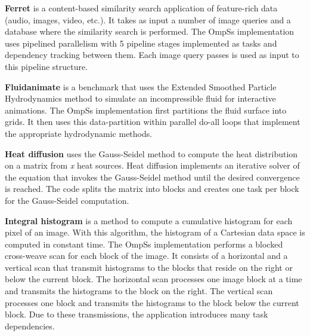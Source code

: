 \textbf{Ferret} is a content-based similarity search application of feature-rich data (audio, images, video, etc.).
It takes as input a number of image queries and a database where the similarity search is performed.
The OmpSs implementation uses pipelined parallelism with 5 pipeline stages implemented as tasks and dependency tracking between them.
Each image query passes is used as input to this pipeline structure.

\textbf{Fluidanimate} is a benchmark that uses the Extended Smoothed Particle Hydrodynamics method to simulate an incompressible fluid for interactive animations. 
The OmpSs implementation first partitions the fluid surface into grids. 
It then uses this data-partition within parallel do-all loops that implement the appropriate hydrodynamic methods.

\textbf{Heat diffusion} uses the Gauss-Seidel method to compute the heat distribution on a matrix from \textit{x} heat sources. 
Heat diffusion implements an iterative solver of the equation that invokes the Gauss-Seidel method until the desired convergence is reached. 
The code splits the matrix into blocks and creates one task per block for the Gauss-Seidel computation. 

\textbf{Integral histogram} is a method to compute a cumulative histogram for each pixel of an image. 
With this algorithm, the histogram of a Cartesian data space is computed in constant time. 
The OmpSs implementation performs a blocked cross-weave scan for each block of the image. 
It consists of a horizontal and a vertical scan that transmit histograms to the blocks that reside on the right or below the current block.
The horizontal scan processes one image block at a time and transmits the histograms to the block on the right. 
The vertical scan processes one block and transmits the histograms to the block below the current block. 
Due to these transmissions, the application introduces many task dependencies. 

